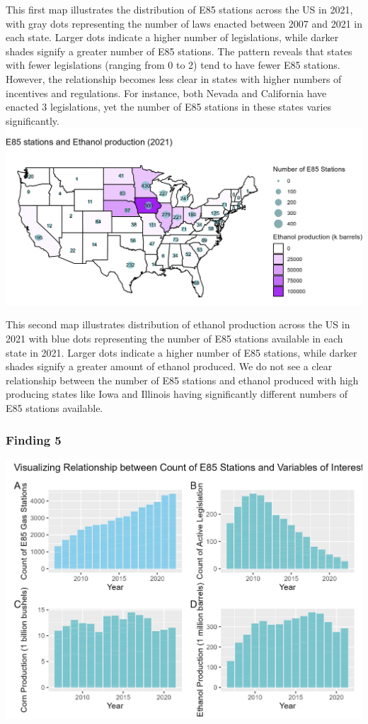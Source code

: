 \documentclass[
]{article}
\begin{document}
This first map illustrates the distribution of E85 stations across the
US in 2021, with gray dots representing the number of laws enacted
between 2007 and 2021 in each state. Larger dots indicate a higher
number of legislations, while darker shades signify a greater number of
E85 stations. The pattern reveals that states with fewer legislations
(ranging from 0 to 2) tend to have fewer E85 stations. However, the
relationship becomes less clear in states with higher numbers of
incentives and regulations. For instance, both Nevada and California
have enacted 3 legislations, yet the number of E85 stations in these
states varies significantly.
\includegraphics[width=6.25in,height=\textheight]{images/ethanol_production_e85.png}

This second map illustrates distribution of ethanol production across
the US in 2021 with blue dots representing the number of E85 stations
available in each state in 2021. Larger dots indicate a higher number of
E85 stations, while darker shades signify a greater amount of ethanol
produced. We do not see a clear relationship between the number of E85
stations and ethanol produced with high producing states like Iowa and
Illinois having significantly different numbers of E85 stations
available.

\hypertarget{finding-5}{%
\subsubsection{Finding 5}\label{finding-5}}

\includegraphics[width=6.25in,height=\textheight]{images/E85Relationships.png}
\end{document}
